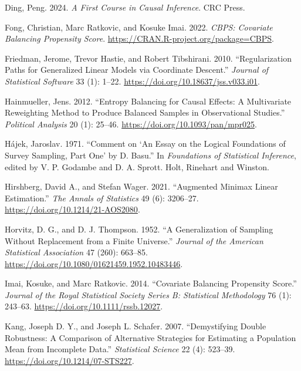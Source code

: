 \documentclass[
  12pt,
  a4paper,
]{article}
\newlength{\cslhangindent}
\newenvironment{CSLReferences}[2] %
 {\begin{list}{}{%
  \setlength{\itemindent}{0pt}
  \setlength{\leftmargin}{0pt}
  \setlength{\parsep}{0pt}
  \ifodd #1
   \setlength{\leftmargin}{\cslhangindent}
   \setlength{\itemindent}{-1\cslhangindent}
  \fi
  \setlength{\itemsep}{#2\baselineskip}}}
 {\end{list}}
\begin{document}
\begin{CSLReferences}{1}{1}
Ding, Peng. 2024. \emph{A First Course in Causal Inference}. CRC Press.

Fong, Christian, Marc Ratkovic, and Kosuke Imai. 2022. \emph{{CBPS}:
Covariate Balancing Propensity Score}.
\url{https://CRAN.R-project.org/package=CBPS}.

Friedman, Jerome, Trevor Hastie, and Robert Tibshirani. 2010.
{``Regularization Paths for Generalized Linear Models via Coordinate
Descent.''} \emph{Journal of Statistical Software} 33 (1): 1--22.
\url{https://doi.org/10.18637/jss.v033.i01}.

Hainmueller, Jens. 2012. {``Entropy Balancing for Causal Effects: A
Multivariate Reweighting Method to Produce Balanced Samples in
Observational Studies.''} \emph{Political Analysis} 20 (1): 25--46.
\url{https://doi.org/10.1093/pan/mpr025}.

Hájek, Jaroslav. 1971. {``Comment on {`{An} Essay on the Logical
Foundations of Survey Sampling, Part One'} by {D. Basu}.''} In
\emph{Foundations of Statistical Inference}, edited by V. P. Godambe and
D. A. Sprott. {Holt, Rinehart and Winston}.

Hirshberg, David A., and Stefan Wager. 2021. {``Augmented Minimax Linear
Estimation.''} \emph{The Annals of Statistics} 49 (6): 3206--27.
\url{https://doi.org/10.1214/21-AOS2080}.

Horvitz, D. G., and D. J. Thompson. 1952. {``A Generalization of
Sampling Without Replacement from a Finite Universe.''} \emph{Journal of
the American Statistical Association} 47 (260): 663--85.
\url{https://doi.org/10.1080/01621459.1952.10483446}.

Imai, Kosuke, and Marc Ratkovic. 2014. {``Covariate Balancing Propensity
Score.''} \emph{Journal of the Royal Statistical Society Series B:
Statistical Methodology} 76 (1): 243--63.
\url{https://doi.org/10.1111/rssb.12027}.

Kang, Joseph D. Y., and Joseph L. Schafer. 2007. {``Demystifying Double
Robustness: A Comparison of Alternative Strategies for Estimating a
Population Mean from Incomplete Data.''} \emph{Statistical Science} 22
(4): 523--39. \url{https://doi.org/10.1214/07-STS227}.


\end{CSLReferences}
\end{document}
